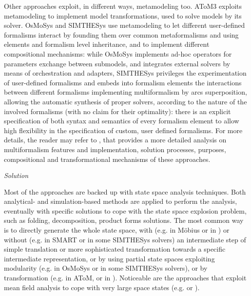 Other approaches exploit, in different ways, metamodeling too. AToM3
\cite{conf/fase/LaraV02,DelV.Sosa2007367} exploits metamodeling to
implement model transformations, used to solve models by its solver. OsMoSys
\cite{Franceschinis02,TOOLS02,ATPN,Franceschinis:2009:IBC:1698822.1698878,Drawnet}
and SIMTHESys \cite{PASM2011,HiPMoS2013,MASCOTS2010,CAMWA2012}
use metamodeling to let different user-defined formalisms interact by founding
them over common metaformalisms and using elements and formalism level
inheritance, and to implement different compositional mechanisms: while OsMoSys
implements ad-hoc operators for parameters exchange between submodels, and
integrates external solvers by means of orchestration and adapters, SIMTHESys
privileges the experimentation of user-defined formalisms and embeds into
formalism elements the interactions between different formalisms implementing
multiformalism by arcs superposition, allowing the automatic synthesis of proper
solvers, according to the nature of the involved formalisms (with no claim for
their optimality): there is an explicit specification of both syntax and
semantics of every formalism element to allow high flexibility in the
specification of custom, user defined formalisms. For more details, the reader
may refer to \cite{multiformalismbook2014-Cap1-IntroMultiformalism}, that
provides a more detailed analysis on multiformalism features and implementation,
solution processes, purposes, compositional and transformational mechanisms of
these approaches.

\emph{Solution}

Most of the approaches are backed up with state space analysis techniques.
Both analytical- and simulation-based methods are applied to perform the
analysis, eventually with specific solutions to cope with the state space
explosion problem, such as folding, decomposition, product forms solutions. The
most common way is to directly generate the whole state space, with (e.g. in
M\"obius or in \cite{Pezze1997239}) or without (e.g. in SMART or in some
SIMTHESys solvers) an intermediate step of simple translation or more
sophisticated transformation towards a specific intermediate representation, or
by using partial state spaces exploiting modularity (e.g. in OsMoSys or in some
SIMTHESys solvers\cite{ENTCS2013ProductForms}), or by transformation (e.g. in
AToM, or in \cite{Bobeanu2004389}). Noticeable are the approaches that exploit
mean field analysis to cope with very large space states (e.g.
\cite{Bradley2013144} or \cite{FGCS2014BigData}).

